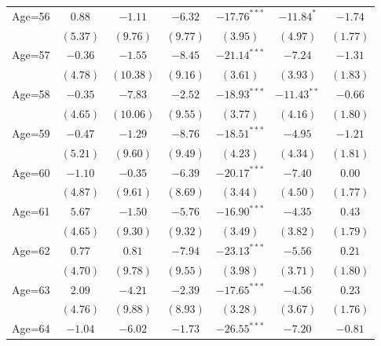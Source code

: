 \documentclass[fullpage]{paper}
\begin{document}
\begin{center}
\begin{longtable}{l c c c c c c }
Age=56      & $0.88$        & $-1.11$       & $-6.32$       & $-17.76^{***}$ & $-11.84^{*}$   & $-1.74$       \\
            & $(5.37)$      & $(9.76)$      & $(9.77)$      & $(3.95)$       & $(4.97)$       & $(1.77)$      \\
Age=57      & $-0.36$       & $-1.55$       & $-8.45$       & $-21.14^{***}$ & $-7.24$        & $-1.31$       \\
            & $(4.78)$      & $(10.38)$     & $(9.16)$      & $(3.61)$       & $(3.93)$       & $(1.83)$      \\
Age=58      & $-0.35$       & $-7.83$       & $-2.52$       & $-18.93^{***}$ & $-11.43^{**}$  & $-0.66$       \\
            & $(4.65)$      & $(10.06)$     & $(9.55)$      & $(3.77)$       & $(4.16)$       & $(1.80)$      \\
Age=59      & $-0.47$       & $-1.29$       & $-8.76$       & $-18.51^{***}$ & $-4.95$        & $-1.21$       \\
            & $(5.21)$      & $(9.60)$      & $(9.49)$      & $(4.23)$       & $(4.34)$       & $(1.81)$      \\
Age=60      & $-1.10$       & $-0.35$       & $-6.39$       & $-20.17^{***}$ & $-7.40$        & $0.00$        \\
            & $(4.87)$      & $(9.61)$      & $(8.69)$      & $(3.44)$       & $(4.50)$       & $(1.77)$      \\
Age=61      & $5.67$        & $-1.50$       & $-5.76$       & $-16.90^{***}$ & $-4.35$        & $0.43$        \\
            & $(4.65)$      & $(9.30)$      & $(9.32)$      & $(3.49)$       & $(3.82)$       & $(1.79)$      \\
Age=62      & $0.77$        & $0.81$        & $-7.94$       & $-23.13^{***}$ & $-5.56$        & $0.21$        \\
            & $(4.70)$      & $(9.78)$      & $(9.55)$      & $(3.98)$       & $(3.71)$       & $(1.80)$      \\
Age=63      & $2.09$        & $-4.21$       & $-2.39$       & $-17.65^{***}$ & $-4.56$        & $0.23$        \\
            & $(4.76)$      & $(9.88)$      & $(8.93)$      & $(3.28)$       & $(3.67)$       & $(1.76)$      \\
Age=64      & $-1.04$       & $-6.02$       & $-1.73$       & $-26.55^{***}$ & $-7.20$        & $-0.81$       \\

\end{longtable}
\end{center}
\end{document}
